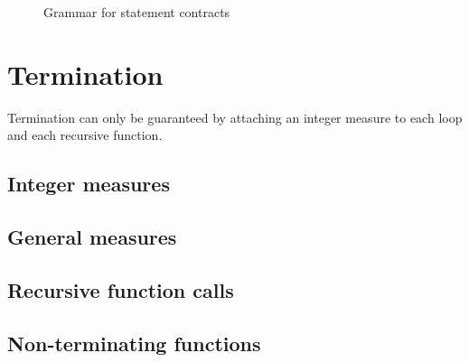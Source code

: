 \begin{figure}[htbp]
  \begin{cadre}
    
  \end{cadre}
  \caption{Grammar for statement contracts}
  \label{fig:gram:stcontracts}
\end{figure}


\section{Termination}
\label{sec:termination}


Termination can only be guaranteed by attaching an integer measure to each loop
and each recursive function.


\subsection{Integer measures}
\label{sec:integermeasures}
\nodiff


\subsection{General measures}
\absent


\subsection{Recursive function calls}
\nodiff


\subsection{Non-terminating functions}
\absent

